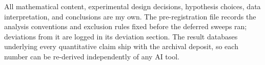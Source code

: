 \documentclass[12pt, a4paper]{report}
\theoremstyle{definition}
\theoremstyle{plain}
\theoremstyle{remark}
\begin{document}
All mathematical content, experimental design decisions, hypothesis
choices, data interpretation, and conclusions are my own. The
pre-registration file records the analysis conventions and
exclusion rules fixed before the deferred sweeps ran; deviations
from it are logged in its deviation section. The result databases
underlying every quantitative claim ship with the archival deposit,
so each number can be re-derived independently of any AI tool.



\end{document}
